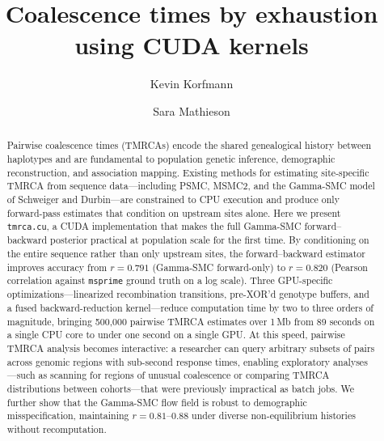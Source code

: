 \documentclass[10pt,letterpaper]{article}
\title{Coalescence times by exhaustion using CUDA kernels}
\author[1]{Kevin Korfmann}
\author[1]{Sara Mathieson}
\affil[1]{Department of Biology, University of Pennsylvania, Philadelphia, PA, USA}
\date{}
\begin{document}
\maketitle

\begin{abstract}
Pairwise coalescence times (TMRCAs) encode the shared genealogical history between haplotypes and are fundamental to population genetic inference, demographic reconstruction, and association mapping.
Existing methods for estimating site-specific TMRCA from sequence data---including PSMC, MSMC2, and the Gamma-SMC model of Schweiger and Durbin---are constrained to CPU execution and produce only forward-pass estimates that condition on upstream sites alone.
Here we present \texttt{tmrca.cu}, a CUDA implementation that makes the full Gamma-SMC forward--backward posterior practical at population scale for the first time.
By conditioning on the entire sequence rather than only upstream sites, the forward--backward estimator improves accuracy from $r=0.791$ (Gamma-SMC forward-only) to $r=0.820$ (Pearson correlation against \texttt{msprime} ground truth on a log scale).
Three GPU-specific optimizations---linearized recombination transitions, pre-XOR'd genotype buffers, and a fused backward-reduction kernel---reduce computation time by two to three orders of magnitude, bringing 500{,}000 pairwise TMRCA estimates over 1\,Mb from 89 seconds on a single CPU core to under one second on a single GPU.
At this speed, pairwise TMRCA analysis becomes interactive: a researcher can query arbitrary subsets of pairs across genomic regions with sub-second response times, enabling exploratory analyses---such as scanning for regions of unusual coalescence or comparing TMRCA distributions between cohorts---that were previously impractical as batch jobs.
We further show that the Gamma-SMC flow field is robust to demographic misspecification, maintaining $r = 0.81$--$0.88$ under diverse non-equilibrium histories without recomputation.
\end{abstract}

\end{document}
